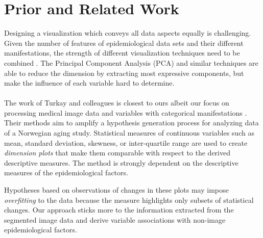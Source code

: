 \documentclass[journal]{style/vgtc} 			          %
\begin{document}
\section{Prior and Related Work}
Designing a visualization which conveys all data aspects equally is challenging.
%
Given the number of features of epidemiological data sets and their different manifestations, the strength of different visualization techniques need to be combined \cite{Buja91, Konyha2009}.
%
The Principal Component Analysis (PCA) and similar techniques are able to reduce the dimension by extracting most expressive components, but make the influence of each variable hard to determine.
\\\\
The work of Turkay and colleagues is closest to ours albeit our focus on processing medical image data and variables with categorical manifestations \cite{Turkay2013}.
%
Their methods aim to amplify a hypothesis generation process for analyzing data of a Norwegian aging study.
%
Statistical measures of continuous variables such as mean, standard deviation, skewness, or inter-quartile range are used to create \emph{dimension plots} that make them comparable with respect to the derived descriptive measures.
%
%
%
%
%
The method is strongly dependent on the descriptive measures of the epidemiological factors.

Hypotheses based on observations of changes in these plots may impose \emph{overfitting} to the data because the measure highlights only subsets of statistical changes.
%
Our approach sticks more to the information extracted from the segmented image data and derive variable associations with non-image epidemiological factors.
\end{document}
